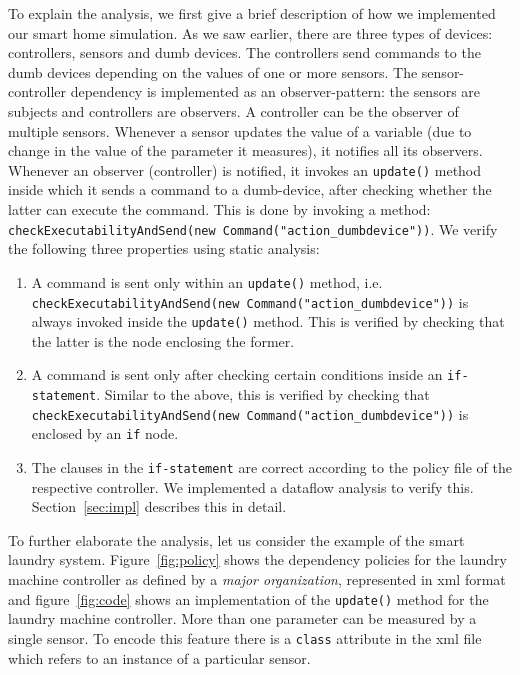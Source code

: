 \documentclass{article}
\begin{document}
To explain the analysis, we first give a brief description of how we implemented our smart home simulation. As we saw earlier, there are three types of devices: controllers, sensors and dumb devices. The controllers send commands to the dumb devices depending on the values of one or more sensors. The sensor-controller dependency is implemented as an observer-pattern: the sensors are subjects and controllers are observers. A controller can be the observer of multiple sensors. Whenever a sensor updates the value of a variable (due to change in the value of the parameter it measures), it notifies all its observers. Whenever an observer (controller) is notified, it invokes an \texttt{update()} method inside which it sends a command to a dumb-device, after checking whether the latter can execute the command. This is done by invoking a method: \texttt{checkExecutabilityAndSend(new Command("action\_dumbdevice"))}. 
We verify the following three properties using static analysis:
\begin{enumerate}[topsep=0pt,itemsep=-1ex,partopsep=1ex,parsep=1ex]
    \item A command is sent only within an \texttt{update()} method, i.e. \\
    \texttt{checkExecutabilityAndSend(new Command("action\_dumbdevice"))} is always invoked inside the \texttt{update()} method. This is verified by checking that the latter is the node enclosing the former.
    \item A command is sent only after checking certain conditions inside an \texttt{if-statement}. Similar to the above, this is verified by checking that \texttt{checkExecutabilityAndSend(new Command("action\_dumbdevice"))} is enclosed by an \texttt{if} node.
    \item The clauses in the \texttt{if-statement} are correct according to the policy file of the respective controller. We implemented a dataflow analysis to verify this. Section~\ref{sec:impl} describes this in detail.\\
\end{enumerate}

To further elaborate the analysis, let us consider the example of the smart laundry system. Figure~\ref{fig:policy} shows the dependency policies for the laundry machine controller as defined by a \textit{major organization}, represented in xml format and figure~\ref{fig:code} shows an implementation of the \texttt{update()} method for the laundry machine controller. More than one parameter can be measured by a single sensor. To encode this feature there is a \texttt{class} attribute in the xml file which refers to an instance of a particular sensor.\\
\end{document}
